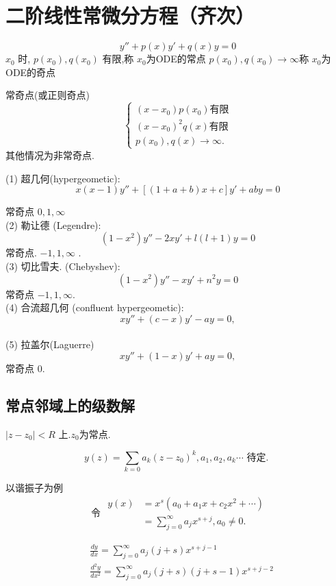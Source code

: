 \section{二阶线性常微分方程（齐次）}
$$
y''+p(x) y '+q(x) y=0
$$
$x_0$ 时, $p\left(x_0\right), q\left(x_0\right)$ 有限,称 $x_0$为ODE的常点
$p\left(x_0\right), q\left(x_0\right) \rightarrow \infty$称 $x_0$为ODE的奇点

常奇点(或正则奇点) $$\left\{\begin{array}{l}
    \left(x-x_0\right) p\left(x_0\right) \text{有限}
    \\
    \left(x-x_0\right)^2 q(x) \text{有限}
    \\ p\left(x_0\right), q(x) \rightarrow \infty .\end{array}
    \right.$$
其他情况为非常奇点.


(1) 超几何(hypergeometic):
$$
x(x-1) y''+[(1+a+b) x+c] y'+a b y= 0
$$

常奇点 $0,1, \infty$\\
(2) 勒让德 (Legendre):
$$
\left(1-x^2\right) y''-2 x y'+l(l+1) y=0
$$
常奇点. $-1,1, \infty$ .\\
(3) 切比雪夫. (Chebyshev):
$$
\left(1-x^2\right) y''-x y'+n^2 y=0 
$$
常奇点 $-1,1, \infty$.\\

(4) 合流超几何 (confluent hypergeometic):
$$
x y''+(c-x) y'-a y=0,
$$
\\
(5) 拉盖尔(Laguerre)
$$
x y''+(1-x) y'+a y=0,
$$
常奇点 $0$.

\subsection{常点邻域上的级数解}
$\left|z-z_0\right|<R$ 上.$z_0$为常点.

$$
y(z)=\sum_{k=0} a_k\left(z-z_0\right)^k, a_1, a_2, a_k \cdots \text { 待定. }
$$


以谐振子为例
$$
\text { 令 } \begin{aligned}
y(x) & =x^s\left(a_0+a_1 x+c_2 x^2+\cdots\right) \\
& =\sum_{j=0}^{\infty} a_j x^{s+j}, a_0 \neq 0 .
\end{aligned}
$$

$$
\begin{aligned}
& \frac{d y}{d x}=\sum_{j=0}^{\infty} a_j(j+s) x^{s+j-1} \\
& \frac{d^2 y}{d x^2}=\sum_{j=0}^{\infty} a_j(j+s)(j+s-1) x^{s+j-2}
\end{aligned}
$$

